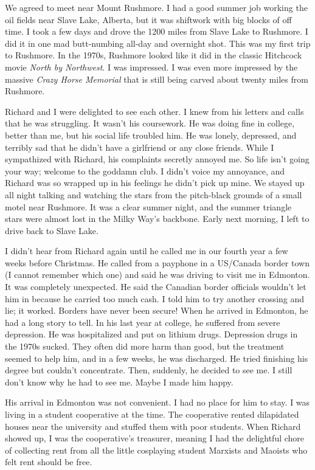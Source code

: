 We agreed to meet near Mount Rushmore. I had a good summer job working
the oil fields near Slave Lake, Alberta, but it was shiftwork with big
blocks of off time. I took a few days and drove the 1200 miles from
Slave Lake to Rushmore. I did it in one mad butt-numbing all-day and
overnight shot. This was my first trip to Rushmore. In the 1970s,
Rushmore looked like it did in the classic Hitchcock movie \emph{North
by Northwest}. I was impressed. I was even more impressed by the massive
\emph{Crazy Horse Memorial} that is still being carved about twenty
miles from Rushmore.

Richard and I were delighted to see each other. I knew from his letters
and calls that he was struggling. It wasn't his coursework. He was doing
fine in college, better than me, but his social life troubled him. He
was lonely, depressed, and terribly sad that he didn't have a girlfriend
or any close friends. While I sympathized with Richard, his complaints
secretly annoyed me. So life isn't going your way; welcome to the goddamn
club. I didn't voice my annoyance, and Richard was so wrapped up in his
feelings he didn't pick up mine. We stayed up all night talking and
watching the stars from the pitch-black grounds of a small motel near
Rushmore. It was a clear summer night, and the summer triangle stars
were almost lost in the Milky Way's backbone. Early next morning, I left
to drive back to Slave Lake.

I didn't hear from Richard again until he called me in our fourth year a
few weeks before Christmas. He called from a payphone in a US/Canada
border town (I cannot remember which one) and said he was driving to
visit me in Edmonton. It was completely unexpected. He said the Canadian
border officials wouldn't let him in because he carried too much cash. I
told him to try another crossing and lie; it worked. Borders have never
been secure! When he arrived in Edmonton, he had a long story to tell.
In his last year at college, he suffered from severe depression. He was
hospitalized and put on lithium drugs. Depression drugs in the 1970s
sucked. They often did more harm than good, but the treatment seemed to
help him, and in a few weeks, he was discharged. He tried finishing his
degree but couldn't concentrate. Then, suddenly, he decided to see me. I
still don't know why he had to see me. Maybe I made him happy.

His arrival in Edmonton was not convenient. I had no place for him to
stay. I was living in a student cooperative at the time. The cooperative
rented dilapidated houses near the university and stuffed them with poor
students. When Richard showed up, I was the cooperative's treasurer,
meaning I had the delightful chore of collecting rent from all the
little cosplaying student Marxists and Maoists who felt rent should be
free.

